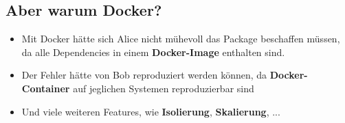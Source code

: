 \subsection{Aber warum Docker?}
\begin{frame}
    \slidehead
    \vspace{-1em}
    \Large
    \begin{itemize}[<+->]
        \item Mit Docker hätte sich Alice nicht mühevoll das Package beschaffen müssen,
              da alle Dependencies in einem \textbf{Docker-Image} enthalten sind.
        \item Der Fehler hätte von Bob reproduziert werden können, da \textbf{Docker-Container}
              auf jeglichen Systemen reproduzierbar sind
        \item Und viele weiteren Features, wie \textbf{Isolierung}, \textbf{Skalierung}, ...
    \end{itemize}
\end{frame}




